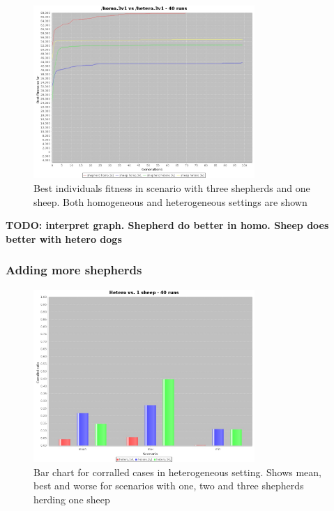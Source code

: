 \documentclass[conference]{IEEEtran}
\begin{document}
\begin{figure}[ht]
	\centering
	\includegraphics[width=3.3in]{imgs/homo3v1-hetero3v1-bestSoFar.jpeg}
	\caption{Best individuals fitness in scenario with three shepherds and one sheep. Both homogeneous and heterogeneous settings are shown}
	\label{fig:3v1_homo_vs_hetero}
\end{figure}

\textbf{TODO: interpret graph. Shepherd do better in homo. Sheep does better with hetero dogs}

\vspace{0.5em}
\subsubsection{Adding more shepherds}

\begin{figure}[ht]
	\centering
	\includegraphics[width=3.3in]{imgs/hetero_1v1-hetero_2v1-hetero_3v1-corralledRatio-bar.jpeg}
	\caption{Bar chart for corralled cases in heterogeneous setting. Shows mean, best and worse for scenarios with one, two and three shepherds herding one sheep}
	\label{fig:corralled_oneSheep}
\end{figure}
\end{document}
